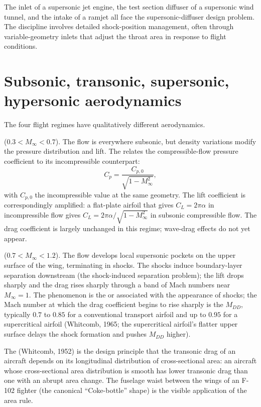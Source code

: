 The inlet of a supersonic jet engine, the test section diffuser of
a supersonic wind tunnel, and the intake of a ramjet all face the
supersonic-diffuser design problem. The discipline involves
detailed shock-position management, often through variable-geometry
inlets that adjust the throat area in response to flight
conditions.

\section{Subsonic, transonic, supersonic, hypersonic aerodynamics}

The four flight regimes have qualitatively different aerodynamics.

 ($0.3 < M_\infty <
0.7$). The flow is everywhere subsonic, but density variations
modify the pressure distribution and lift. The
 relates the compressible-flow
pressure coefficient to its incompressible counterpart:
\[
C_p = \frac{C_{p,0}}{\sqrt{1 - M_\infty^2}},
\]
with $C_{p,0}$ the incompressible value at the same geometry. The
lift coefficient is correspondingly amplified: a flat-plate airfoil
that gives $C_L = 2\pi\alpha$ in incompressible flow gives
$C_L = 2\pi\alpha/\sqrt{1 - M_\infty^2}$ in subsonic compressible
flow. The drag coefficient is largely unchanged in this regime;
wave-drag effects do not yet appear.

 ($0.7 < M_\infty < 1.2$). The
flow develops local supersonic pockets on the upper surface of
the wing, terminating in shocks. The shocks induce boundary-layer
separation downstream (the shock-induced separation problem); the
lift drops sharply and the drag rises sharply through a band of
Mach numbers near $M_\infty = 1$. The phenomenon is the
 or  associated with
the appearance of shocks; the Mach number at which the drag
coefficient begins to rise sharply is the  $M_{DD}$, typically $0.7$ to $0.85$ for a conventional
transport airfoil and up to $0.95$ for a supercritical airfoil
(Whitcomb, 1965; the supercritical airfoil's flatter upper surface
delays the shock formation and pushes $M_{DD}$ higher).

The  (Whitcomb, 1952) is the design principle
that the transonic drag of an aircraft depends on its longitudinal
distribution of cross-sectional area: an aircraft whose
cross-sectional area distribution is smooth has lower transonic
drag than one with an abrupt area change. The fuselage waist
between the wings of an F-102 fighter (the canonical
``Coke-bottle'' shape) is the visible application of the area
rule.

